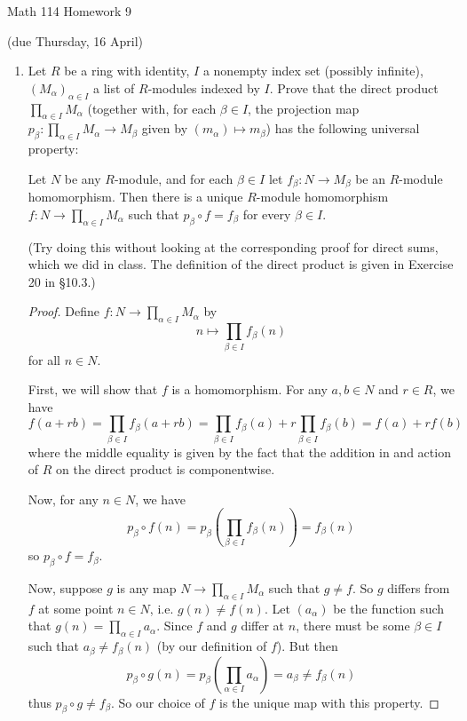 \documentclass[10pt]{article}
\begin{document}
\begin{center}
\large Math 114 Homework 9

\normalsize (due Thursday, 16 April)
\end{center}

\begin{enumerate}

\item Let $R$ be a ring with identity, $I$ a nonempty index set (possibly infinite), $(M_\alpha)_{\alpha \in I}$ a list of $R$-modules indexed by $I$.  Prove that the direct product $\prod_{\alpha \in I} M_\alpha$ (together with, for each $\beta \in I$, the projection map $p_\beta: \prod_{\alpha \in I} M_\alpha \rightarrow M_\beta$ given by $(m_\alpha) \mapsto m_\beta$) has the following universal property: 

Let $N$ be any $R$-module, and for each $\beta \in I$ let $f_\beta: N \rightarrow M_\beta$ be an $R$-module homomorphism.  Then there is a unique $R$-module homomorphism $f: N \rightarrow \prod_{\alpha \in I} M_\alpha$ such that $p_\beta \circ f = f_\beta$ for every $\beta \in I$.

(Try doing this without looking at the corresponding proof for direct sums, which we did in class.  The definition of the direct product is given in Exercise 20 in \S 10.3.)

\begin{proof}
Define $f: N \rightarrow \prod_{\alpha \in I} M_\alpha$ by
$$
n \mapsto \prod_{\beta \in I} f_{\beta}(n)
$$
for all $n \in N$.

First, we will show that $f$ is a homomorphism.  For any $a,b \in N$ and $r \in R$, we have
$$
f(a+rb) = \prod_{\beta \in I} f_{\beta}(a + rb) = \prod_{\beta \in I} f_{\beta}(a) + r\prod_{\beta \in I}f_{\beta}(b) = f(a) + rf(b)
$$
where the middle equality is given by the fact that the addition in and action of $R$ on the direct product is componentwise.

Now, for any $n \in N$, we have
$$
p_{\beta} \circ f (n) = p_{\beta} \left( \prod_{\beta \in I} f_{\beta}(n) \right) = f_{\beta}(n)
$$
so $p_{\beta} \circ f = f_{\beta}$.

Now, suppose $g$ is any map $ N \rightarrow \prod_{\alpha \in I} M_\alpha$ such that $g \neq f$.  So $g$ differs from $f$ at some point $n \in N$, i.e. $g(n) \neq f(n)$.  Let $(a_{\alpha})$ be the function such that $g(n) = \prod_{\alpha \in I} a_{\alpha}$.  Since $f$ and $g$ differ at $n$, there must be some $\beta \in I$ such that $a_{\beta} \neq f_{\beta}(n)$ (by our definition of $f$).  But then
$$
p_{\beta} \circ g (n) = p_{\beta} \left( \prod_{\alpha \in I} a_{\alpha} \right) = a_{\beta} \neq f_{\beta}(n)
$$
thus $p_{\beta} \circ g \neq f_{\beta}$.  So our choice of $f$ is the unique map with this property.
\end{proof}


\end{enumerate}
\end{document}
